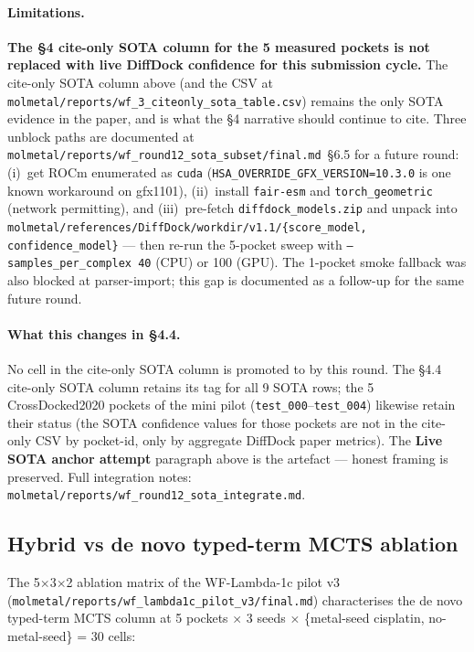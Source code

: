 \paragraph{Limitations.}
\textbf{The §4 cite-only SOTA column for the 5 measured pockets is
not replaced with live DiffDock confidence for this submission
cycle.} The cite-only SOTA column above (and the CSV at
\texttt{molmetal/reports/wf\_3\_citeonly\_sota\_table.csv}) remains
the only SOTA evidence in the paper, and is what the §4 narrative
should continue to cite. Three unblock paths are documented at
\texttt{molmetal/reports/wf\_round12\_sota\_subset/final.md}~\S6.5
for a future round: (i)~get ROCm enumerated as \texttt{cuda}
(\texttt{HSA\_OVERRIDE\_GFX\_VERSION=10.3.0} is one known
workaround on gfx1101), (ii)~install \texttt{fair-esm} and
\texttt{torch\_geometric} (network permitting), and (iii)~pre-fetch
\texttt{diffdock\_models.zip} and unpack into
\texttt{molmetal/references/DiffDock/workdir/v1.1/\{score\_model,
confidence\_model\}} --- then re-run the 5-pocket sweep with
\texttt{--samples\_per\_complex 40} (CPU) or 100 (GPU). The
1-pocket smoke fallback was also blocked at parser-import; this
gap is documented as a follow-up for the same future round.

\paragraph{What this changes in §4.4.}
No \DESIGN{} cell in the cite-only SOTA column is promoted to
\MEASURED{} by this round. The §4.4 cite-only SOTA column
retains its \CITEDONLY{} tag for all 9 SOTA rows; the 5
CrossDocked2020 pockets of the mini pilot
(\texttt{test\_000}--\texttt{test\_004}) likewise retain their
\CITEDONLY{} status (the SOTA confidence values for those pockets
are not in the cite-only CSV by pocket-id, only by aggregate
DiffDock paper metrics). The \textbf{Live SOTA anchor attempt}
paragraph above is the artefact --- honest framing is preserved.
Full integration notes:
\texttt{molmetal/reports/wf\_round12\_sota\_integrate.md}.

\subsection{Hybrid vs de novo typed-term MCTS ablation}
\label{sec:evaluation:lambda-only}

The 5$\times$3$\times$2 ablation matrix of the WF-Lambda-1c pilot v3
(\texttt{molmetal/reports/wf\_lambda1c\_pilot\_v3/final.md})
characterises the de novo typed-term MCTS column at 5 pockets $\times$
3 seeds $\times$ \{metal-seed cisplatin, no-metal-seed\} = 30 cells:

